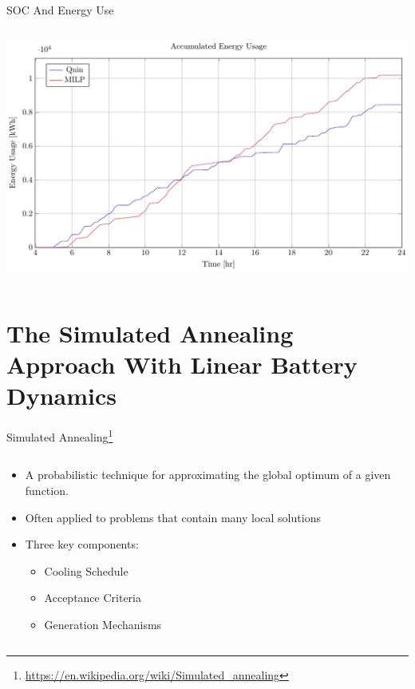 \documentclass[aspectratio=169]{beamer}
\begin{document}
\begin{frame}[label={sec:orgc40f143}]{SOC And Energy Use}
\begin{columns}
\begin{column}{0.5\columnwidth}
\begin{center}
\includegraphics[width=\textwidth]{./img/milp-pap/energy-milp-pap.pdf}
\end{center}
\end{column}
\end{columns}
\end{frame}

\section{The Simulated Annealing Approach With Linear Battery Dynamics}
\label{sec:orgd6b00f4}
\begin{frame}[label={sec:orge0b7956}]{Simulated Annealing\footnote{\url{https://en.wikipedia.org/wiki/Simulated\_annealing}}}
\begin{columns}
\begin{column}{0.5\columnwidth}
\begin{itemize}
\item A probabilistic technique for approximating the global optimum of a given function.
\item Often applied to problems that contain many local solutions
\item Three key components:
\begin{itemize}
\item Cooling Schedule
\item Acceptance Criteria
\item Generation Mechanisms
\end{itemize}
\end{itemize}
\end{column}

\begin{column}{0.5\columnwidth}
\centering
{}
\end{column}
\end{columns}
\end{frame}
\end{document}
